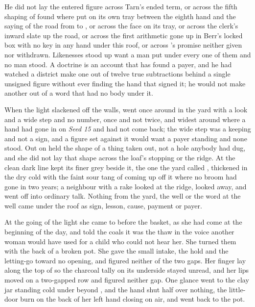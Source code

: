 He did not lay the entered figure across Tarn's ended term, or across the fifth shaping of  found where put on its own tray between the eighth hand and the saying of the road from  to , or across the face on its tray, or across the clerk's inward slate up the road, or across the first arithmetic gone up  in Berr's locked box with no key in any hand under this roof, or across 's promise neither given nor withdrawn. Likenesses stood up want a man put under every one of them and no man stood. A doctrine is an account that has found a payer, and he had watched a district make one out of twelve true subtractions behind a single unsigned figure without ever finding the hand that signed it; he would not make another out of a word that had no body under it.

When the light slackened off the walls,  went once around  in the yard with a look and a wide step and no number, once and not twice, and widest around  where a hand had gone in on \emph{Seed 15} and had not come back; the wide step was a keeping and not a sign, and a figure set against it would want a payer standing and none stood. Out on   held the shape of a thing taken out, not a hole anybody had dug, and she did not lay that shape across the loaf's stopping or the ridge. At  the clean dark line kept its finer grey beside it, the one the yard called , thickened in the dry cold with the faint sour tang of  coming up off it where no broom had gone in two years; a neighbour with a rake looked at the ridge, looked away, and went off into ordinary talk. Nothing from the yard, the well or the word at the well came under the roof as sign, lesson, cause, payment or payer.

At the going of the light she came to  before the basket, as she had come at the beginning of the day, and told the coals it was the thaw in the voice another woman would have used for a child who could not hear her. She turned them with the back of a broken pot. She gave the small intake, the hold and the letting-go toward no opening, and figured neither of the two gaps. Her finger lay along the top of  so the charcoal tally on its underside stayed unread, and her lips moved on a two-gapped row and figured neither gap. One glance went to the clay jar standing cold under  beyond , and the hand shut half over nothing, the little-door burn on the back of her left hand closing on air, and went back to the pot.

